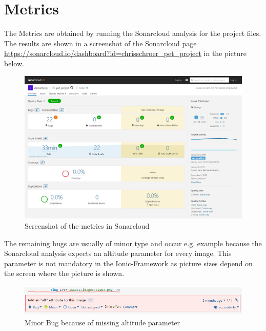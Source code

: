 \documentclass[12pt]{article}
\begin{document}
\newpage
\section{Metrics}
The Metrics are obtained by running the Sonarcloud analysis for the project files. The results are shown in a screenshot of the Sonarcloud page \url{https://sonarcloud.io/dashboard?id=chrisschroer_pet_project} in the picture below.
\begin{figure}[H]
  \centering
    \includegraphics[width=1\textwidth]{figures/Sonarcloud.png}
    \caption{Screenshot of the metrics in Sonarcloud}
\end{figure}


The remaining bugs are usually of minor type and occur e.g. example because the Sonarcloud analysis expects an altitude parameter for every image. This parameter is not mandatory in the Ionic-Framework as picture sizes depend on the screen where the picture is shown.
\begin{figure}[H]
  \centering
    \includegraphics[width=1\textwidth]{figures/BugAlt.png}
    \caption{Minor Bug because of missing altitude parameter}
\end{figure}
\end{document}
